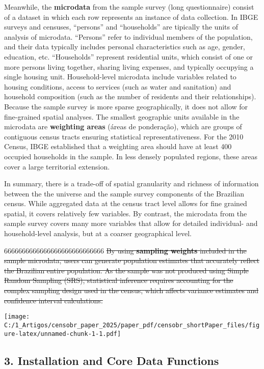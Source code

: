 \documentclass[
]{article}
\begin{document}
Meanwhile, the \textbf{microdata} from the sample survey (long
questionnaire) consist of a dataset in which each row represents an
instance of data collection. In IBGE surveys and censuses, ``persons''
and ``households'' are tipically the units of analysis of microdata.
``Persons'' refer to individual members of the population, and their
data typically includes personal characteristics such as age, gender,
education, etc. ``Households'' represent residential units, which
consist of one or more persons living together, sharing living expenses,
and typically occupying a single housing unit. Household-level microdata
include variables related to housing conditions, access to services
(such as water and sanitation) and household composition (such as the
number of residents and their relationships). Because the sample survey
is more sparse geographically, it does not allow for fine-grained
spatial analyses. The smallest geographic units available in the
microdata are \textbf{weighting areas} (áreas de ponderação), which are
groups of contiguous census tracts ensuring statistical
representativeness. For the 2010 Census, IBGE established that a
weighting area should have at least 400 occupied households in the
sample. In less densely populated regions, these areas cover a large
territorial extension.

In summary, there is a trade-off of spatial granularity and richness of
information between the the universe and the sample survey components of
the Brazilian census. While aggregated data at the census tract level
allows for fine grained spatial, it covers relatively few variables. By
contrast, the microdata from the sample survey covers many more
variables that allow for detailed individual- and household-level
analysis, but at a coarser geographical level.

6666666666666666666666666666 \st{By using \textbf{sampling weights}
included in the sample microdata, users can generate population
estimates that accurately reflect the Brazilian entire population. As
the sample was not produced using Simple Random Sampling (SRS),
statistical inference requires accounting for the complex sampling
design used in the census, which affects variance estimates and
confidence interval calculations.}

\texttt{[image: C:/1\_Artigos/censobr\_paper\_2025/paper\_pdf/censobr\_shortPaper\_files/figure-latex/unnamed-chunk-1-1.pdf]}

\subsection{3. Installation and Core Data
Functions}\label{installation-and-core-data-functions}
\end{document}
